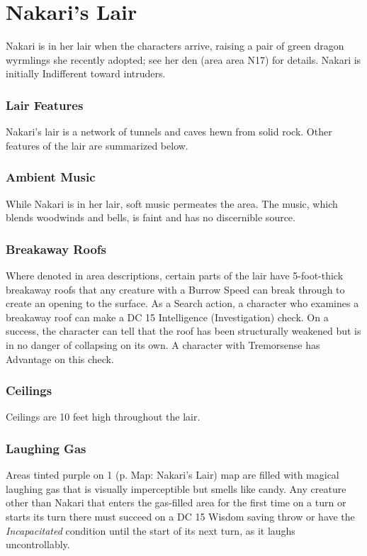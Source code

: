 \documentclass[letterpaper, 11pt, twocolumn]{dndbook}
\begin{document}
\section{Nakari's Lair}

Nakari is in her lair when the characters arrive, raising a pair of green dragon wyrmlings she recently adopted; see her den (area area N17) for details. Nakari is initially Indifferent toward intruders.

\subsubsection{Lair Features}

Nakari's lair is a network of tunnels and caves hewn from solid rock. Other features of the lair are summarized below.

\subsubsection{Ambient Music}

While Nakari is in her lair, soft music permeates the area. The music, which blends woodwinds and bells, is faint and has no discernible source.

\subsubsection{Breakaway Roofs}

Where denoted in area descriptions, certain parts of the lair have 5-foot-thick breakaway roofs that any creature with a Burrow Speed can break through to create an opening to the surface. As a Search action, a character who examines a breakaway roof can make a DC 15 Intelligence (Investigation) check. On a success, the character can tell that the roof has been structurally weakened but is in no danger of collapsing on its own. A character with Tremorsense has Advantage on this check.

\subsubsection{Ceilings}

Ceilings are 10 feet high throughout the lair.

\subsubsection{Laughing Gas}

Areas tinted purple on 1 (p. Map: Nakari's Lair) map are filled with magical laughing gas that is visually imperceptible but smells like candy. Any creature other than Nakari that enters the gas-filled area for the first time on a turn or starts its turn there must succeed on a DC 15 Wisdom saving throw or have the \textit{Incapacitated} condition until the start of its next turn, as it laughs uncontrollably.
\end{document}
